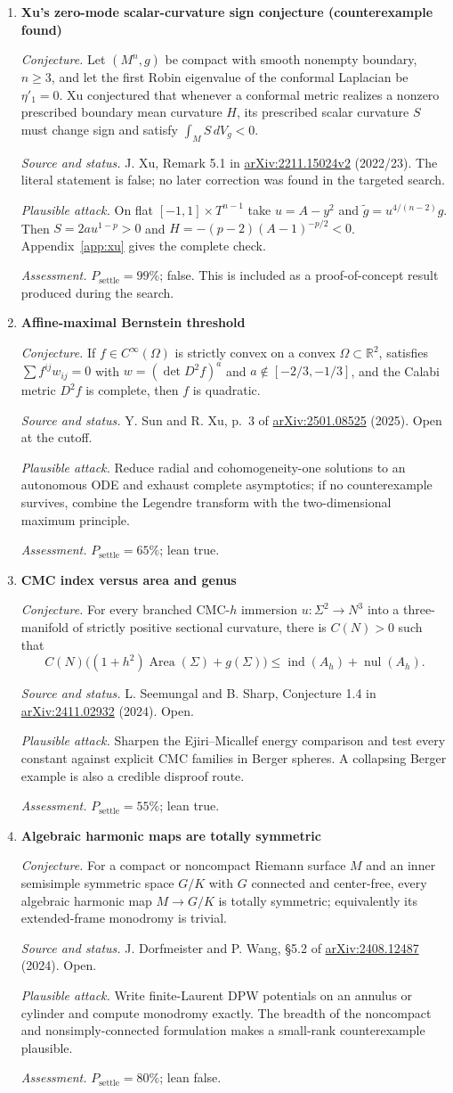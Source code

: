 \documentclass[11pt]{article}
\newcommand{\cand}[5]{%
  \item \textbf{#1}\par
  \emph{Conjecture.} #2\par
  \emph{Source and status.} #3\par
  \emph{Plausible attack.} #4\par
  \emph{Assessment.} #5
}
\newcommand{\psettle}{P_{\mathrm{settle}}}
\begin{document}
\begin{enumerate}[label=\textbf{L\arabic*.}]

\cand{Xu's zero-mode scalar-curvature sign conjecture (counterexample found)}
{Let $(M^n,g)$ be compact with smooth nonempty boundary, $n\ge3$, and let the first Robin eigenvalue of the conformal Laplacian be $\eta'_1=0$.  Xu conjectured that whenever a conformal metric realizes a nonzero prescribed boundary mean curvature $H$, its prescribed scalar curvature $S$ must change sign and satisfy $\int_M S\,dV_g<0$.}
{J. Xu, Remark 5.1 in \href{https://arxiv.org/abs/2211.15024}{arXiv:2211.15024v2} (2022/23).  The literal statement is false; no later correction was found in the targeted search.}
{On flat $[-1,1]\times T^{n-1}$ take $u=A-y^2$ and $\widetilde g=u^{4/(n-2)}g$.  Then $S=2a u^{1-p}>0$ and $H=-(p-2)(A-1)^{-p/2}<0$.  Appendix~\ref{app:xu} gives the complete check.}
{$\psettle=99\%$; false.  This is included as a proof-of-concept result produced during the search.}

\cand{Affine-maximal Bernstein threshold}
{If $f\in C^\infty(\Omega)$ is strictly convex on a convex $\Omega\subset\mathbb R^2$, satisfies $\sum f^{ij}w_{ij}=0$ with $w=(\det D^2f)^a$ and $a\notin[-2/3,-1/3]$, and the Calabi metric $D^2f$ is complete, then $f$ is quadratic.}
{Y. Sun and R. Xu, p.~3 of \href{https://arxiv.org/abs/2501.08525}{arXiv:2501.08525} (2025).  Open at the cutoff.}
{Reduce radial and cohomogeneity-one solutions to an autonomous ODE and exhaust complete asymptotics; if no counterexample survives, combine the Legendre transform with the two-dimensional maximum principle.}
{$\psettle=65\%$; lean true.}

\cand{CMC index versus area and genus}
{For every branched CMC-$h$ immersion $u:\Sigma^2\to N^3$ into a three-manifold of strictly positive sectional curvature, there is $C(N)>0$ such that
\[C(N)\bigl((1+h^2)\operatorname{Area}(\Sigma)+g(\Sigma)\bigr)\le \operatorname{ind}(A_h)+\operatorname{nul}(A_h).\]}
{L. Seemungal and B. Sharp, Conjecture 1.4 in \href{https://arxiv.org/abs/2411.02932}{arXiv:2411.02932} (2024).  Open.}
{Sharpen the Ejiri--Micallef energy comparison and test every constant against explicit CMC families in Berger spheres.  A collapsing Berger example is also a credible disproof route.}
{$\psettle=55\%$; lean true.}

\cand{Algebraic harmonic maps are totally symmetric}
{For a compact or noncompact Riemann surface $M$ and an inner semisimple symmetric space $G/K$ with $G$ connected and center-free, every algebraic harmonic map $M\to G/K$ is totally symmetric; equivalently its extended-frame monodromy is trivial.}
{J. Dorfmeister and P. Wang, \S5.2 of \href{https://arxiv.org/abs/2408.12487}{arXiv:2408.12487} (2024).  Open.}
{Write finite-Laurent DPW potentials on an annulus or cylinder and compute monodromy exactly.  The breadth of the noncompact and nonsimply-connected formulation makes a small-rank counterexample plausible.}
{$\psettle=80\%$; lean false.}


\end{enumerate}
\end{document}
